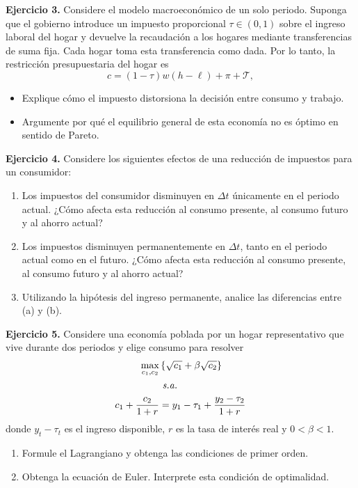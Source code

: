 \documentclass[12pt]{article}
\numberwithin{equation}{section}             %
\theoremstyle{definition}                    %
\theoremstyle{plain}                         %
\theoremstyle{remark} %
\theoremstyle{definition}
\begin{document}
\textbf{Ejercicio 3.} Considere el modelo macroeconómico de un solo periodo. Suponga que el gobierno introduce un impuesto proporcional $\tau\in(0,1)$ sobre el ingreso laboral del hogar y devuelve la recaudación a los hogares mediante transferencias de suma fija. Cada hogar toma esta transferencia como dada. Por lo tanto, la restricción presupuestaria del hogar es
$$
c=(1-\tau)w(h-\ell)+\pi+\mathcal{T},
$$

\begin{itemize}
    \item[(a)] Explique cómo el impuesto distorsiona la decisión entre consumo y trabajo.
    \item[(b)] Argumente por qué el equilibrio general de esta economía no es óptimo en sentido de Pareto.
\end{itemize}



\textbf{Ejercicio 4.} Considere los siguientes efectos de una reducción de impuestos para un consumidor:
\begin{enumerate}
    \item[(a)] Los impuestos del consumidor disminuyen en $\Delta t$ únicamente en el periodo actual. ¿Cómo afecta esta reducción al consumo presente, al consumo futuro y al ahorro actual?
    
    \item[(b)] Los impuestos disminuyen permanentemente en $\Delta t$, tanto en el periodo actual como en el futuro. ¿Cómo afecta esta reducción al consumo presente, al consumo futuro y al ahorro actual? 
    \item[(c)] Utilizando la hipótesis del ingreso permanente, analice las diferencias entre (a) y (b).
\end{enumerate}




\textbf{Ejercicio 5.} Considere una economía poblada por un hogar representativo que vive durante dos periodos y elige consumo para resolver
\begin{align*}
  \max_{c_1,c_2}
&\left\{
\sqrt{c_1}
+\beta  \sqrt{c_2}
\right\} \\
&\text{ \textit{s.a.} } \\
c_1+\frac{c_2}{1+r}
&=
y_1 - \tau_1+\frac{y_2 - \tau_2 }{1+r}
\end{align*}
donde \(y_t - \tau_t\) es el ingreso disponible, \(r\) es la tasa de interés real y \(0<\beta<1\).
\begin{enumerate}
    \item[(a)] Formule el Lagrangiano y obtenga las condiciones de primer orden.
    \item[(b)] Obtenga la ecuación de Euler. Interprete esta condición de optimalidad.
\end{enumerate}
\end{document}
